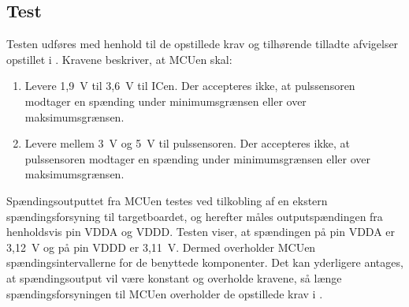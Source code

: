 \subsection{Test}
Testen udføres med henhold til de opstillede krav og tilhørende tilladte afvigelser opstillet i . Kravene beskriver, at MCUen skal:
\begin{enumerate}
	\item Levere 1,9~V til 3,6~V til ICen. Der accepteres ikke, at pulssensoren modtager en spænding under minimumsgrænsen eller over maksimumsgrænsen.
	\item Levere mellem 3~V og 5~V til pulssensoren. Der accepteres ikke, at pulssensoren modtager en spænding under minimumsgrænsen eller over maksimumsgrænsen.
\end{enumerate}

Spændingsoutputtet fra MCUen testes ved tilkobling af en ekstern spændingsforsyning til targetboardet, og herefter måles outputspændingen fra henholdsvis pin VDDA og VDDD.  \newline
Testen viser, at spændingen på pin VDDA er 3,12~V og på pin VDDD er 3,11~V. Dermed overholder MCUen spændingsintervallerne for de benyttede komponenter. Det kan yderligere antages, at spændingsoutput vil være konstant og overholde kravene, så længe spændingsforsyningen til MCUen overholder de opstillede krav i .


